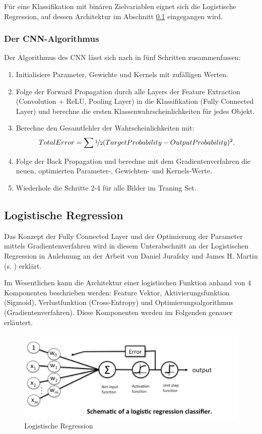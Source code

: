 Für eine Klassifikation mit binären Zielvariablen eignet sich die Logistische Regression, auf dessen Architektur im Abschnitt \ref{subsec:logReg} eingegangen wird. 

\subsubsection{Der CNN-Algorithmus}
Der Algorithmus des CNN lässt sich nach \cite{2} in fünf Schritten zusammenfassen:
\begin{enumerate}
\item Initialisiere Parameter, Gewichte und Kernels mit zufälligen Werten.
\item Folge der Forward Propagation durch alle Layers der Feature Extraction (Convolution + ReLU, Pooling Layer) in die Klassifikation (Fully Connected Layer) und berechne die ersten Klassenwahrscheinlichkeiten für jedes Objekt.
\item Berechne den Gesamtfehler der Wahrscheinlichkeiten mit:
\begin{equation}
Total Error = \sum \nicefrac{1}{2} (Target Probability - Output Probability) ^2. \label{Total Error}
\end{equation}
\item Folge der Back Propagation und berechne mit dem Gradientenverfahren die neuen, optimierten Parameter-, Gewichten- und Kernels-Werte.
\item Wiederhole die Schritte 2-4 für alle Bilder im Traning Set.
\end{enumerate}


\subsection{Logistische Regression} \label{subsec:logReg}
Das Konzept der Fully Connected Layer und der Optimierung der Parameter mittels Gradientenverfahren wird in diesem Unterabschnitt an der Logistischen Regression in Anlehnung an der Arbeit von Daniel Jurafsky und James H. Martin (s. \cite{6}) erklärt.



Im Wesentlichen kann die Architektur einer logistischen Funktion anhand von 4 Komponenten beschrieben werden: Feature Vektor, Aktivierungsfunktion (Sigmoid), Verlustfunktion (Cross-Entropy) und Optimierungsalgorithmus (Gradientenverfahren). Diese Komponenten werden im Folgenden genauer erläutert. 


\begin{figure}[H]
\centering
\includegraphics[width=0.5\linewidth]{pic/Klassifikation/LogRegSchema.png}
\caption{\label{pic:logreg} Logistische Regression}
\end{figure}



